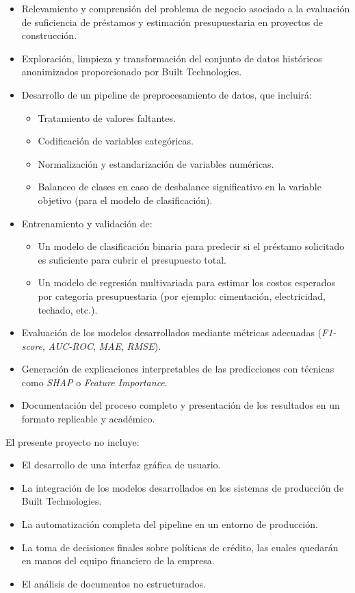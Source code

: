 \documentclass[
11pt, %
]{charter}
\begin{document}
\begin{itemize}
    \item Relevamiento y comprensión del problema de negocio asociado a la evaluación de suficiencia de préstamos y estimación presupuestaria en proyectos de construcción.
    \item Exploración, limpieza y transformación del conjunto de datos históricos anonimizados proporcionado por Built Technologies.
    \item Desarrollo de un pipeline de preprocesamiento de datos, que incluirá:
    \begin{itemize}
        \item Tratamiento de valores faltantes.
        \item Codificación de variables categóricas.
        \item Normalización y estandarización de variables numéricas.
        \item Balanceo de clases en caso de desbalance significativo en la variable objetivo (para el modelo de clasificación).
    \end{itemize}
    \item Entrenamiento y validación de:
    \begin{itemize}
        \item Un modelo de clasificación binaria para predecir si el préstamo solicitado es suficiente para cubrir el presupuesto total.
        \item Un modelo de regresión multivariada para estimar los costos esperados por categoría presupuestaria (por ejemplo: cimentación, electricidad, techado, etc.).
    \end{itemize}
    \item Evaluación de los modelos desarrollados mediante métricas adecuadas (\textit{F1-score}, \textit{AUC-ROC}, \textit{MAE}, \textit{RMSE}).
    \item Generación de explicaciones interpretables de las predicciones con técnicas como \textit{SHAP} o \textit{Feature Importance}.
    \item Documentación del proceso completo y presentación de los resultados en un formato replicable y académico.
\end{itemize}

El presente proyecto no incluye:

\begin{itemize}
    \item El desarrollo de una interfaz gráfica de usuario.
    \item La integración de los modelos desarrollados en los sistemas de producción de Built Technologies.
    \item La automatización completa del pipeline en un entorno de producción.
    \item La toma de decisiones finales sobre políticas de crédito, las cuales quedarán en manos del equipo financiero de la empresa.
    \item El análisis de documentos no estructurados.
\end{itemize}
\end{document}
